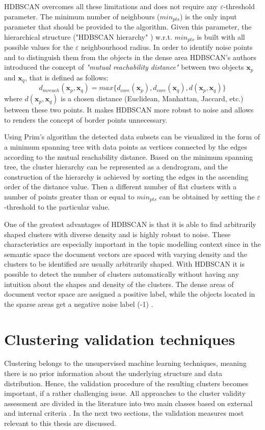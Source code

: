 \documentclass[fontsize=12pt,a4paper,twoside,openany]{scrbook}
\begin{document}
HDBSCAN overcomes all these limitations and does not require any \(\varepsilon\)-threshold parameter. The minimum number of neighbours (\(min_{pts}\)) is the only input parameter that should be provided to the algorithm. Given this parameter, the hierarchical structure ("HDBSCAN hierarchy" \parencite{Campello13}) w.r.t. \(min_{pts}\) is built with all possible values for the \(\varepsilon\) neighbourhood radius. In order to identify noise points and to distinguish them from the objects in the dense area HDBSCAN's authors introduced the concept of \emph{"mutual reachability distance"} \parencite[p.~163]{Campello13} between two objects \(\textbf{x}_p\) and \(\textbf{x}_q\), that is defined as follows: \[d_{mreach}(\textbf{x}_p, \textbf{x}_q) = max\{d_{core}(\textbf{x}_p), d_{core}(\textbf{x}_q), d(\textbf{x}_p, \textbf{x}_q)\}\] 
where \(d(\textbf{x}_p, \textbf{x}_q)\) is a chosen distance (Euclidean, Manhattan, Jaccard, etc.) between these two points. It makes HDBSCAN more robust to noise and allows to renders the concept of border points unnecessary. 

Using Prim's algorithm \parencite{Mamun16} the detected data subsets can be visualized in the form of a minimum spanning tree with data points as vertices connected by the edges according to the mutual reachability distance. Based on the minimum spanning tree, the cluster hierarchy can be represented as a dendrogram, and the construction of the hierarchy is achieved by sorting the edges in the ascending order of the distance value. Then a different number of flat clusters with a number of points greater than or equal to \(min_{pts}\) can be obtained by setting the \(\varepsilon\)-threshold to the particular value.

One of the greatest advantages of HDBSCAN is that it is able to find arbitrarily shaped clusters with diverse density and is highly robust to noise. These characteristics are especially important in the topic modelling context since in the semantic space the document vectors are spaced with varying density \parencite{Angelov20} and the clusters to be identified are usually arbitrarily shaped. With HDBSCAN it is possible to detect the number of clusters automatically without having any intuition about the shapes and density of the clusters. The dense areas of document vector space are assigned a positive label, while the objects located in the sparse areas get a negative noise label (-1) \parencite{Angelov20}.

\section{Clustering validation techniques}
\label{sec:validation}
Clustering belongs to the unsupervised machine learning techniques, meaning there is no prior information about the underlying structure and data distribution. Hence, the validation procedure of the resulting clusters becomes important, if a rather challenging issue. All approaches to the cluster validity assessment are divided in the literature into two main classes based on external and internal criteria \parencite{Halkidi01a}. In the next two sections, the validation measures most relevant to this thesis are discussed.
\end{document}

